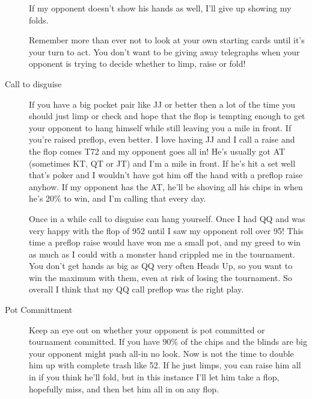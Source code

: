 \begin{description}
If my opponent doesn't show his hands as well, I'll give
up showing my folds.

Remember more than ever not to look at your own
starting cards until it's your turn to act. You
don't want to be giving away telegraphs when your
opponent is trying to decide whether to limp, raise
or fold! 

\item[Call to disguise] If you have a big pocket
pair like JJ or better then a lot of the time
you should just limp or check and hope that the
flop is tempting enough to get your opponent to hang himself
while still leaving you a mile in front. If you're
raised preflop, even better. I love having JJ
and I call a raise and the flop comes T72 and my
opponent goes all in! He's usually got AT (sometimes
KT, QT or JT) and I'm a mile in front. If he's hit
a set well that's poker and I wouldn't have got him
off the hand with a preflop raise anyhow. If my
opponent has the AT, he'll be shoving
all his chips in when he's 20\% to win, and I'm calling
that every day.

Once in a while call to disguise can hang yourself. Once
I had QQ and was very happy with the flop of 952 until I
saw my opponent roll over 95! This time a preflop raise
would have won me a small pot, and my greed to win as much
as I could with a monster hand crippled me in the tournament.
You don't get hands as big as QQ very often Heads Up, so
you want to win the maximum with them, even at risk
of losing the tournament. So overall I think that my QQ call
preflop was the right play.

\item[Pot Committment] Keep an eye out on whether your opponent is pot committed
or tournament committed. If you have 90\% of the chips and
the blinds are big your opponent might push all-in no look.
Now is not the time to double him up with complete trash like
52. If he just limps, you can raise him all in if you think
he'll fold, but in this instance I'll let him take a flop,
hopefully miss, and then bet him all in on any flop. 

\end{description}
